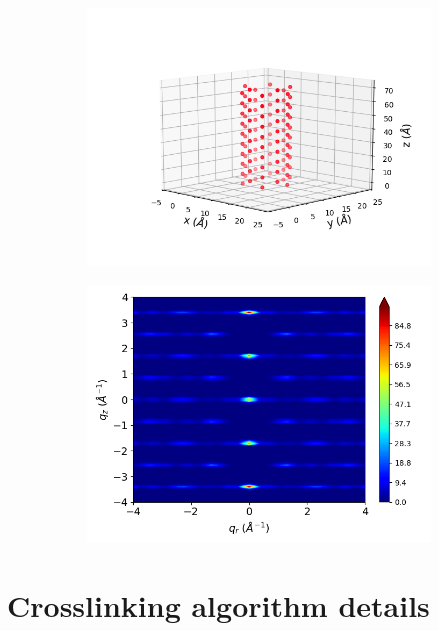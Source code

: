 \documentclass[journal=jpcbfk,manusciprt=article]{achemso}
\begin{document}
\begin{figure}[!htb]
\begin{subfigure}{0.45\textwidth}
  \includegraphics[width=\textwidth]{simple_offset_realspace.png}
  \caption{}\label{fig:simple_offset_realspace}
  \end{subfigure}
  \begin{subfigure}{0.45\textwidth}
  \includegraphics[width=\textwidth]{simple_offset_rzplot.png}
  \caption{}\label{fig:simple_offset_rzplot}
  \end{subfigure}
  \caption{}\label{fig:simple_FTs}
  \end{figure}

  \section{Crosslinking algorithm details}\label{section:xlink}
\end{document}

